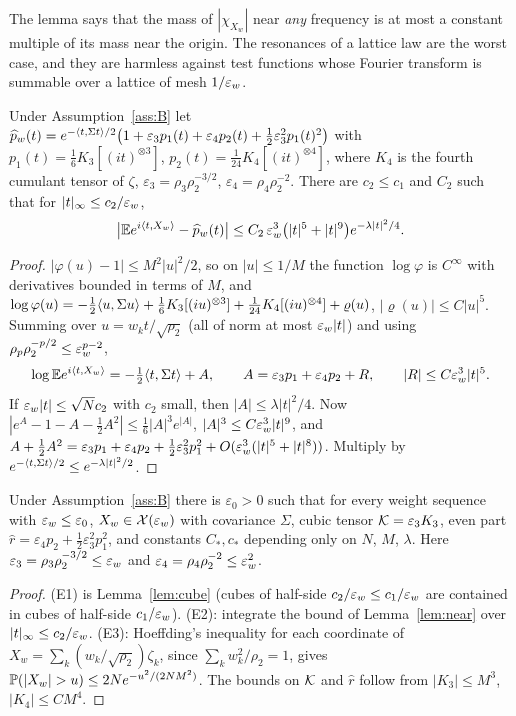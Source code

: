 The lemma says that the mass of $|\chi_{X_w}|$ near \emph{any} frequency is at most a constant multiple of its mass near
the origin. The resonances of a lattice law are the worst case, and they are harmless against test functions whose
Fourier transform is summable over a lattice of mesh $1/\varepsilon_w$.

\begin{lemma}\label{lem:near}
Under Assumption~\ref{ass:B} let
$\widehat{p}_w(t)=e^{-\langle t, \Sigma t\rangle/2}\big(1+\varepsilon_3p_1(t)+\varepsilon_4p_2(t)+\frac12\varepsilon_3^2p_1(t)^2\big)$ with
$p_1(t)=\frac16K_3[(it)^{\otimes3}]$, $p_2(t)=\frac1{24}K_4[(it)^{\otimes4}]$, where $K_4$ is the fourth cumulant tensor of $\zeta$, $\varepsilon_3=\rho_3\rho_2^{-3/2}$,
$\varepsilon_4=\rho_4\rho_2^{-2}$. There are $c_2\le c_1$ and $C_2$ such that for $|t|_\infty\le c_2/\varepsilon_w$,
\[
\big|\mathbb{E} e^{i\langle t, X_w\rangle}-\widehat{p}_w(t)\big|\le C_2\,\varepsilon_w^3\big(|t|^5+|t|^{9}\big)e^{-\lambda|t|^2/4}.
\]
\end{lemma}
\begin{proof}
$|\varphi(u)-1|\le M^2|u|^2/2$, so on $|u|\le1/M$ the function $\log\varphi$ is $C^\infty$ with derivatives bounded in
terms of $M$, and $\log\varphi(u)=-\frac12\langle u, \Sigma u\rangle+\frac16K_3[(iu)^{\otimes3}]+\frac1{24}K_4[(iu)^{\otimes4}]+\varrho(u)$,
$|\varrho(u)|\le C|u|^5$. Summing over $u=w_kt/\sqrt{\rho_2}$ (all of norm at most $\varepsilon_w|t|$) and using
$\rho_p\rho_2^{-p/2}\le\varepsilon_w^{p-2}$,
\[
\log\mathbb{E} e^{i\langle t, X_w\rangle}=-\tfrac12\langle t, \Sigma t\rangle+A,\qquad A=\varepsilon_3p_1+\varepsilon_4p_2+R,\qquad
|R|\le C\varepsilon_w^3|t|^5 .
\]
If $\varepsilon_w|t|\le\sqrt Nc_2$ with $c_2$ small, then $|A|\le\lambda|t|^2/4$. Now $|e^A-1-A-\frac12A^2|\le\frac16|A|^3e^{|A|}$,
$|A|^3\le C\varepsilon_w^3|t|^9$, and
$A+\frac12A^2=\varepsilon_3p_1+\varepsilon_4p_2+\frac12\varepsilon_3^2p_1^2+O(\varepsilon_w^3(|t|^5+|t|^8))$. Multiply by
$e^{-\langle t, \Sigma t\rangle/2}\le e^{-\lambda|t|^2/2}$.
\end{proof}

\begin{proposition}\label{prop:sums}
Under Assumption~\ref{ass:B} there is $\varepsilon_0>0$ such that for every weight sequence with $\varepsilon_w\le\varepsilon_0$,
$X_w\in\mathcal X(\varepsilon_w)$ with covariance $\Sigma$, cubic tensor $\mathcal{K}=\varepsilon_3K_3$, even part
$\widehat r=\varepsilon_4p_2+\frac12\varepsilon_3^2p_1^2$, and constants $C_\ast,c_\ast$ depending only on $N$, $M$,
$\lambda$. Here $\varepsilon_3=\rho_3\rho_2^{-3/2}\le\varepsilon_w$ and $\varepsilon_4=\rho_4\rho_2^{-2}\le\varepsilon_w^2$.
\end{proposition}
\begin{proof}
\textup{(E1)} is Lemma~\ref{lem:cube} (cubes of half-side $c_2/\varepsilon_w\le c_1/\varepsilon_w$ are contained in cubes of half-side
$c_1/\varepsilon_w$). \textup{(E2)}: integrate the bound of Lemma~\ref{lem:near} over $|t|_\infty\le c_2/\varepsilon_w$. \textup{(E3)}:
Hoeffding's inequality for each coordinate of $X_w=\sum_k(w_k/\sqrt{\rho_2})\zeta_k$, since
$\sum_kw_k^2/\rho_2=1$, gives $\Prob(|X_w|>u)\le2Ne^{-u^2/(2NM^2)}$. The bounds on $\mathcal{K}$ and $\widehat r$ follow from
$|K_3|\le M^3$, $|K_4|\le CM^4$.
\end{proof}

